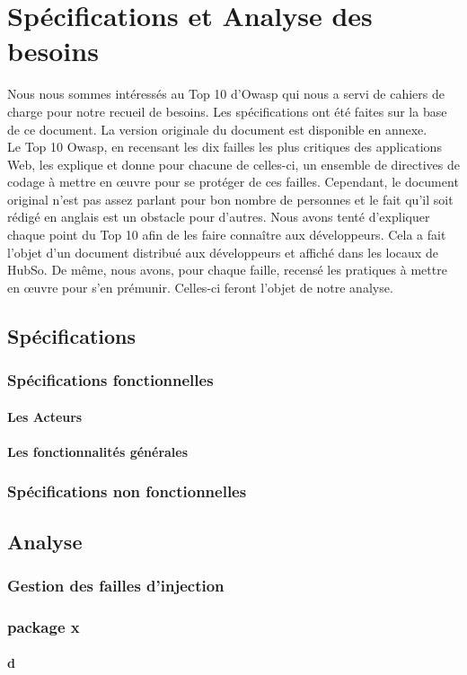\chapter{Spécifications et Analyse des besoins}
Nous nous sommes intéressés au Top 10 d'Owasp qui nous a servi de cahiers de charge pour notre recueil de besoins. Les spécifications ont été faites sur la base de ce document. La version originale du document est disponible en annexe.\\
Le Top 10 Owasp, en recensant les dix failles les plus critiques des applications Web, les explique et donne pour chacune de celles-ci, un ensemble de directives de codage à mettre en œuvre pour se protéger de ces failles. Cependant, le document original n'est pas assez parlant pour bon nombre de personnes et le fait qu'il soit rédigé en anglais est un obstacle pour d'autres. Nous avons tenté d'expliquer chaque point du Top 10 afin de les faire connaître aux développeurs. Cela a fait l'objet d'un document distribué aux développeurs et affiché dans les locaux de HubSo. De même, nous avons, pour chaque faille, recensé les pratiques à mettre en œuvre pour s'en prémunir. Celles-ci feront l'objet de notre analyse.

\section{Spécifications}
\subsection{Spécifications fonctionnelles}
\subsubsection{Les Acteurs}
\subsubsection{Les fonctionnalités générales}
\subsection{Spécifications non fonctionnelles}



\section{Analyse}

\subsection{Gestion des failles d'injection}

\subsection{package x}

\subsubsection*{d}


\clearpage 